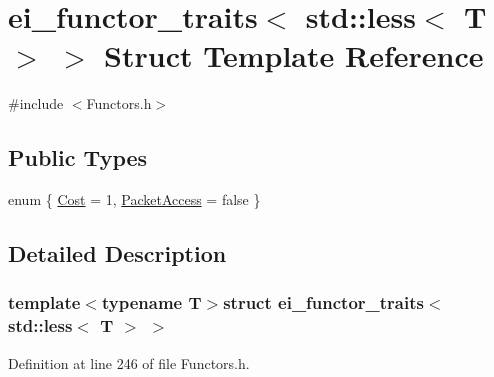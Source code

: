 \hypertarget{structei__functor__traits_3_01std_1_1less_3_01_t_01_4_01_4}{\section{ei\-\_\-functor\-\_\-traits$<$ std\-:\-:less$<$ T $>$ $>$ Struct Template Reference}
\label{structei__functor__traits_3_01std_1_1less_3_01_t_01_4_01_4}
}


{\ttfamily \#include $<$Functors.\-h$>$}

\subsection*{Public Types}
\begin{DoxyCompactItemize}
\item 
enum \{ \hyperlink{structei__functor__traits_3_01std_1_1less_3_01_t_01_4_01_4_aeb96279d568b7234040424a4dbe13bd5a844f45e6840d879cec36836b1846bd67}{Cost} = 1, 
\hyperlink{structei__functor__traits_3_01std_1_1less_3_01_t_01_4_01_4_aeb96279d568b7234040424a4dbe13bd5ad468e82fd861cfbc49f392b174e6b0b7}{Packet\-Access} = false
 \}
\end{DoxyCompactItemize}


\subsection{Detailed Description}
\subsubsection*{template$<$typename T$>$struct ei\-\_\-functor\-\_\-traits$<$ std\-::less$<$ T $>$ $>$}



Definition at line 246 of file Functors.\-h.



